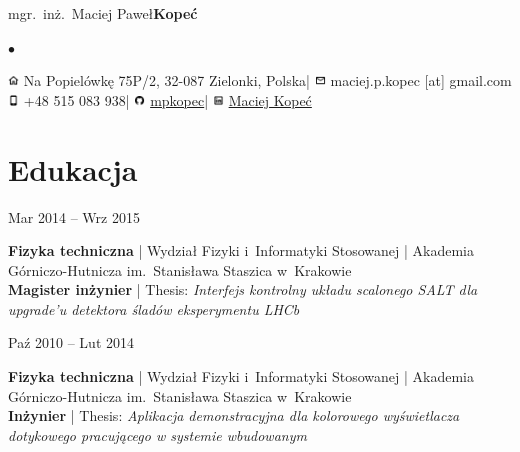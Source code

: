 \documentclass[11pt,a4paper,sans]{article}
\newcommand{\twhorline}[1]{\noindent\makebox[\linewidth]{\rule{\textwidth}{#1}}}
\newcommand{\cvedudateitem}[6]{

	\noindent
	\begin{minipage}[t]{0.22\linewidth}
		#1
	\end{minipage}
	\hfill
	\begin{minipage}[t]{0.76\linewidth}
		{\bfseries #2} | #3 | #4\\
		\textbf{#5} | Thesis: \emph{#6}
	\end{minipage}
	\vspace{1\baselineskip}

}
\newcommand{\firstname}{Maciej Paweł}
\newcommand{\familyname}{Kopeć}
\newcommand{\address}{Na Popielówkę 75P/2, 32-087 Zielonki, Polska}
\newcommand{\mobile}{+48 515 083 938}
\newcommand{\email}{maciej.p.kopec [at] gmail.com}
\newcommand{\github}{\href{https://github.com/mpkopec}{mpkopec}}
\newcommand{\linkedin}{\href{https://www.linkedin.com/in/maciej-kope\%C4\%87-46735595/}{Maciej Kopeć}}
\begin{document}
	\begin{center}
		{mgr.~inż.~\Huge \firstname \space \bfseries \familyname \normalfont}
		\vspace{1\baselineskip}

		\large
		\renewcommand*{\do}[1]{$\bullet$ #1 }
		$\bullet$
		\vspace{0.2\baselineskip}
		\twhorline{1pt}

		\vspace{0.25\baselineskip}
		\includegraphics[height=0.8em]{img/icons8-home-96.png}
		\address \space |
		\includegraphics[height=0.8em]{img/icons8-envelope-96.png}
		\email \\

		\includegraphics[height=0.8em]{img/icons8-iphone-96.png}
		\mobile \space |
		\includegraphics[height=0.8em]{img/icons8-github-96.png}
		\github \space |
		\includegraphics[height=0.8em]{img/icons8-linkedin-96.png}
		\linkedin

		\twhorline{1pt}

	\end{center}

	\section{Edukacja}
	\cvedudateitem
		{Mar 2014 -- Wrz 2015}
		{Fizyka techniczna}
		{Wydział Fizyki i~Informatyki Stosowanej}
		{Akademia Górniczo-Hutnicza im.~Stanisława Staszica w~Krakowie}
		{Magister inżynier}
		{Interfejs kontrolny układu scalonego SALT dla upgrade'u detektora śladów eksperymentu LHCb}
	\cvedudateitem
		{Paź 2010 -- Lut 2014}
		{Fizyka techniczna}
		{Wydział Fizyki i~Informatyki Stosowanej}
		{Akademia Górniczo-Hutnicza im.~Stanisława Staszica w~Krakowie}
		{Inżynier}
		{Aplikacja demonstracyjna dla kolorowego wyświetlacza dotykowego pracującego w systemie wbudowanym}
\end{document}
